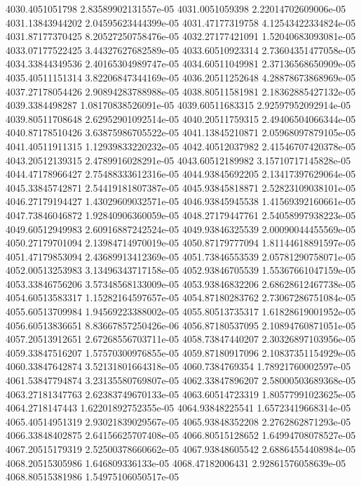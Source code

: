 {4030.4051051798 2.83589902131557e-05
4031.0051059398 2.22014702609006e-05
4031.13843944202 2.04595623444399e-05
4031.47177319758 4.12543422334824e-05
4031.87177370425 8.20527250758476e-05
4032.27177421091 1.52040683093081e-05
4033.07177522425 3.44327627682589e-05
4033.60510923314 2.73604351477058e-05
4034.33844349536 2.40165304989747e-05
4034.60511049981 2.37136568650909e-05
4035.40511151314 3.82206847344169e-05
4036.20511252648 4.28878673868969e-05
4037.27178054426 2.90894283788988e-05
4038.80511581981 2.18362885427132e-05
4039.3384498287 1.08170838526091e-05
4039.60511683315 2.92597952092914e-05
4039.80511708648 2.62952901092514e-05
4040.20511759315 2.49406504066344e-05
4040.87178510426 3.63875986705522e-05
4041.13845210871 2.05968097879105e-05
4041.40511911315 1.12939833220232e-05
4042.40512037982 2.41546707420378e-05
4043.20512139315 2.4789916028291e-05
4043.60512189982 3.15710717145828e-05
4044.47178966427 2.75488333612316e-05
4044.93845692205 2.13417397629064e-05
4045.33845742871 2.54419181807387e-05
4045.93845818871 2.52823109038101e-05
4046.27179194427 1.43029609032571e-05
4046.93845945538 1.41569392160661e-05
4047.73846046872 1.92840906360059e-05
4048.27179447761 2.54058997938223e-05
4049.60512949983 2.60916887242524e-05
4049.93846325539 2.00090044455569e-05
4050.27179701094 2.13984714970019e-05
4050.87179777094 1.81144618891597e-05
4051.47179853094 2.43689913412369e-05
4051.73846553539 2.05781290758071e-05
4052.00513253983 3.13496343717158e-05
4052.93846705539 1.55367661047159e-05
4053.33846756206 3.57348568133009e-05
4053.93846832206 2.68628612467738e-05
4054.60513583317 1.15282164597657e-05
4054.87180283762 2.73067286751084e-05
4055.60513709984 1.94569223388002e-05
4055.80513735317 1.61828619001952e-05
4056.60513836651 8.83667857250426e-06
4056.87180537095 2.10894760871051e-05
4057.20513912651 2.67268556703711e-05
4058.73847440207 2.30326897103956e-05
4059.33847516207 1.57570300976855e-05
4059.87180917096 2.10837351154929e-05
4060.33847642874 3.52131801664318e-05
4060.7384769354 1.78921760002597e-05
4061.53847794874 3.23135580769807e-05
4062.33847896207 2.58000503689368e-05
4063.27181347763 2.62383749670133e-05
4063.60514723319 1.80577991023625e-05
4064.2718147443 1.62201892752355e-05
4064.93848225541 1.65723419668314e-05
4065.40514951319 2.93021839029567e-05
4065.93848352208 2.2762862871293e-05
4066.33848402875 2.64156625707408e-05
4066.80515128652 1.64994708078527e-05
4067.20515179319 2.52500378660662e-05
4067.93848605542 2.68864554408984e-05
4068.20515305986 1.646809336133e-05
4068.47182006431 2.92861576058639e-05
4068.80515381986 1.54975106050517e-05
}
